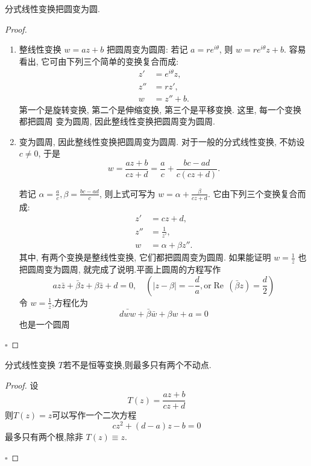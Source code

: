 \documentclass[../../复变函数.tex]{subfiles}
\begin{document}
\begin{definition}
    分式线性变换把圆变为圆.
\end{definition}
\begin{proof}
    \begin{enumerate}
        \item 整线性变换 \(  w= az+ b  \) 把圆周变为圆周:
        若记 $a = re^{i\theta}$, 则 $w = re^{i\theta} z + b$. 容易看出,
它可由下列三个简单的变换复合而成:
\[
\begin{aligned}
z' &= e^{i\theta} z, \\
z'' &= rz', \\
w &= z'' + b.
\end{aligned}
\]
第一个是旋转变换, 第二个是伸缩变换, 第三个是平移变换. 这里, 每一个变换都把圆周
变为圆周, 因此整线性变换把圆周变为圆周. 
\item 变为圆周, 因此整线性变换把圆周变为圆周. 对于一般的分式线性变换, 不妨设 $c \neq 0$, 于是
$$w = \frac{az+b}{cz+d} = \frac{a}{c} + \frac{bc-ad}{c(cz+d)}.$$

若记 $\alpha = \frac{a}{c}, \beta = \frac{bc-ad}{c}$, 则上式可写为
$w = \alpha + \frac{\beta}{cz+d}.$
它由下列三个变换复合而成:
\[
\begin{aligned}
z' &= cz+d, \\ z'' &= \frac{1}{z'}, \\ w &= \alpha + \beta z''. 
\end{aligned}
\]
其中, 有两个变换是整线性变换, 它们都把圆周变为圆周. 如果能证明 $w = \frac{1}{z}$ 也把圆周变为圆周, 就完成了说明.平面上圆周的方程写作 \[
az \bar{z}+ \bar{\beta}z+ \beta \bar{z}+ d= 0,\quad (\left| z-\beta  \right|= -\frac{d }{a },  \text{or} \operatorname{Re}\,\left( \bar{\beta}z \right)= \frac{d }{2 }     )
\]令 \(  w= \frac{1 }{z }   \),方程化为 \[
\bar{dww}+ \bar{\beta}\bar{w}+ \beta w+ a= 0
\] 也是一个圆周
    \end{enumerate}
    

    \hfill $\square$
\end{proof}

\begin{proposition}
    分式线性变换 \(  T  \)若不是恒等变换,则最多只有两个不动点.
\end{proposition}
\begin{proof}
    设 \[
    T\left( z \right)= \frac{az+ b }{cz+ d }  
    \]则\(  T\left( z \right)= z   \)可以写作一个二次方程 \[
    cz^{2}+ \left( d-a \right)z-b= 0 
    \] 最多只有两个根,除非 \(  T\left( z \right)\equiv z   \). 

    \hfill $\square$
\end{proof}
\end{document}
